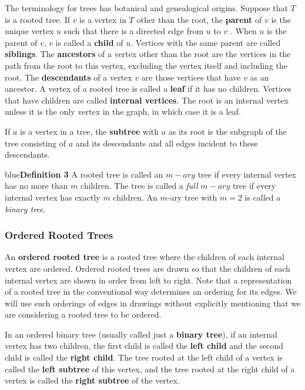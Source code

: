 \documentclass{article}
\begin{document}
The terminology for trees has botanical and genealogical origins. Suppose that $T$ is a rooted tree. If $v$ is a vertex in $T$ other than the root, the \textbf{parent} of $v$ is the unique vertex $u$ such that there is a directed edge from $u$ to $v$ . When $u$ is the parent of $v$, $v$ is called a \textbf{child} of $u$. Vertices with the same parent are called \textbf{siblings}. The \textbf{ancestors} of a vertex other than the root are the vertices in the path from the root to this vertex, excluding the vertex itself and including the root. The \textbf{descendants} of a vertex $v$ are those vertices that have $v$ as an ancestor. A vertex of a rooted tree is called a \textbf{leaf} if it has no children. Vertices that have children are called \textbf{internal vertices}. The root is an internal vertex unless it is the only vertex in the graph, in which case it is a leaf.

If $a$ is a vertex in a tree, the \textbf{subtree} with $a$ as its root is the subgraph of the tree consisting of $a$ and its descendants and all edges incident to these descendants.

\begin{mybox}{blue}{\textbf{Definition 3}}
A rooted tree is called an $m-ary$ tree if every internal vertex has no more than $m$ children. The tree is called a \textit{full} $m-ary$ tree if every internal vertex has exactly $m$ children. An $m$-ary
tree with $m = 2$ is called a \textit{binary tree}.
\end{mybox}

\subsubsection{Ordered Rooted Trees}

An \textbf{ordered rooted tree} is a rooted tree where the children of each internal vertex are ordered. Ordered rooted trees are drawn so that the children of each internal vertex are shown in order from left to right. Note that a representation of a rooted tree in the conventional way determines an ordering for its edges. We will use such orderings of edges in drawings without explicitly mentioning that we are considering a rooted tree to be ordered.

\newpage In an ordered binary tree (usually called just a \textbf{binary tree}), if an internal vertex has two children, the first child is called the \textbf{left child} and the second child is called the \textbf{right child}. The tree rooted at the left child of a vertex is called the \textbf{left subtree} of this vertex, and the tree rooted at the right child of a vertex is called the \textbf{right subtree} of the vertex.
\end{document}
